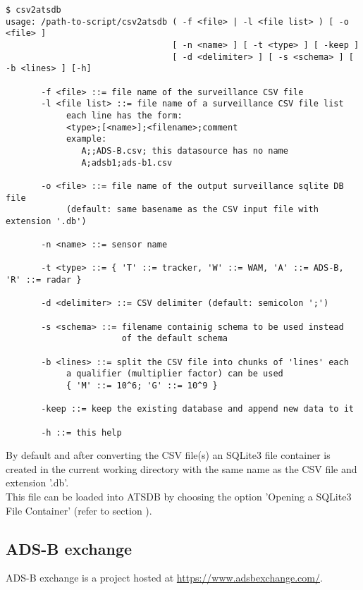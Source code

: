 \begin{verbatim}
$ csv2atsdb
usage: /path-to-script/csv2atsdb ( -f <file> | -l <file list> ) [ -o <file> ]
                                 [ -n <name> ] [ -t <type> ] [ -keep ]
                                 [ -d <delimiter> ] [ -s <schema> ] [ -b <lines> ] [-h]

       -f <file> ::= file name of the surveillance CSV file
       -l <file list> ::= file name of a surveillance CSV file list
            each line has the form:
            <type>;[<name>];<filename>;comment
            example:
               A;;ADS-B.csv; this datasource has no name
               A;adsb1;ads-b1.csv

       -o <file> ::= file name of the output surveillance sqlite DB file
            (default: same basename as the CSV input file with extension '.db')

       -n <name> ::= sensor name

       -t <type> ::= { 'T' ::= tracker, 'W' ::= WAM, 'A' ::= ADS-B, 'R' ::= radar }

       -d <delimiter> ::= CSV delimiter (default: semicolon ';')

       -s <schema> ::= filename containig schema to be used instead
                       of the default schema

       -b <lines> ::= split the CSV file into chunks of 'lines' each
            a qualifier (multiplier factor) can be used
            { 'M' ::= 10^6; 'G' ::= 10^9 }

       -keep ::= keep the existing database and append new data to it

       -h ::= this help
\end{verbatim}

By default and after converting the CSV file(s) an SQLite3 file container is created in the current working directory with the same name as the CSV file and extension '.db'. \\

This file can be loaded into ATSDB by choosing the option 'Opening a SQLite3 File Container' (refer to section ).

\subsection{ADS-B exchange}

ADS-B exchange is a project hosted at \url{https://www.adsbexchange.com/}. \\

